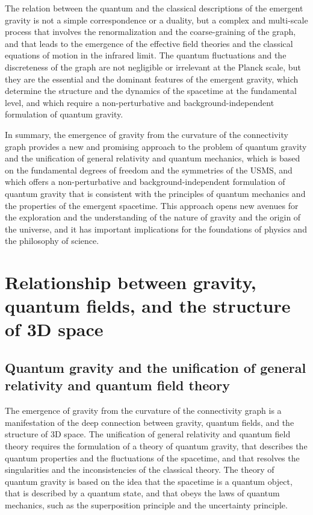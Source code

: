 \begin{tcolorbox}[colback=green!5!white,colframe=green!75!black,title=Question]
    The relation between the quantum and the classical descriptions of the emergent gravity is not a simple correspondence or a duality, but a complex and multi-scale process that involves the renormalization and the coarse-graining of the graph, and that leads to the emergence of the effective field theories and the classical equations of motion in the infrared limit. The quantum fluctuations and the discreteness of the graph are not negligible or irrelevant at the Planck scale, but they are the essential and the dominant features of the emergent gravity, which determine the structure and the dynamics of the spacetime at the fundamental level, and which require a non-perturbative and background-independent formulation of quantum gravity.

    In summary, the emergence of gravity from the curvature of the connectivity graph provides a new and promising approach to the problem of quantum gravity and the unification of general relativity and quantum mechanics, which is based on the fundamental degrees of freedom and the symmetries of the USMS, and which offers a non-perturbative and background-independent formulation of quantum gravity that is consistent with the principles of quantum mechanics and the properties of the emergent spacetime. This approach opens new avenues for the exploration and the understanding of the nature of gravity and the origin of the universe, and it has important implications for the foundations of physics and the philosophy of science.
\end{tcolorbox}

\section{Relationship between gravity, quantum fields, and the structure of 3D space}
\subsection{Quantum gravity and the unification of general relativity and quantum field theory}
The emergence of gravity from the curvature of the connectivity graph is a manifestation of the deep connection between gravity, quantum fields, and the structure of 3D space. The unification of general relativity and quantum field theory requires the formulation of a theory of quantum gravity, that describes the quantum properties and the fluctuations of the spacetime, and that resolves the singularities and the inconsistencies of the classical theory. The theory of quantum gravity is based on the idea that the spacetime is a quantum object, that is described by a quantum state, and that obeys the laws of quantum mechanics, such as the superposition principle and the uncertainty principle.

